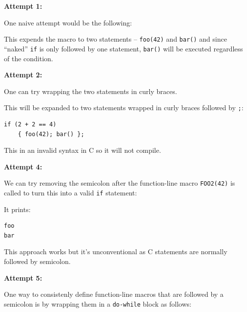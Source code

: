 \textbf{Attempt 1:}

One naive attempt would be the following:



This expends the macro to two statements -- \texttt{foo(42)} and \texttt{bar()} and since ``naked'' \texttt{if} is only followed by one statement, \texttt{bar()} will be executed regardless of the condition.

\textbf{Attempt 2:}

One can try wrapping the two statements in curly braces.


This will be expanded to two statements wrapped in curly braces followed by \texttt{;}:
\begin{verbatim}
if (2 + 2 == 4)
	{ foo(42); bar() };
\end{verbatim}
This in an invalid syntax in C so it will not compile.

\textbf{Attempt 4:}

We can try removing the semicolon after the function-line macro \texttt{FOO2(42)} is called to turn this into a valid \texttt{if} statement:



It prints:
\begin{verbatim}
foo
bar
\end{verbatim}
This approach works but it's unconventional as C statements are normally followed by semicolon.

\textbf{Attempt 5:}

One way to consistenly define function-line macros that are followed by a semicolon is by wrapping them in a \texttt{do-while} block as follows:




